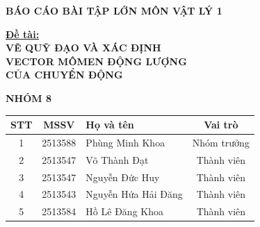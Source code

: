\documentclass{report}
\newcounter{line}
\begin{document}
\begin{titlepage}
\linespread{1.3}
\restoregeometry
\centering %

    \vspace*{0cm} %
    
    {\fontsize{20pt}{24pt}\selectfont %
        \textbf{BÁO CÁO BÀI TẬP LỚN MÔN VẬT LÝ 1}}
    
    \vfill %
    
    {\fontsize{20pt}{24pt}\selectfont
        \textbf{\underline{Đề tài:}}} \\
    \vspace{1.5cm}
    {\fontsize{26pt}{30pt}\selectfont %
        \textbf{VẼ QUỸ ĐẠO VÀ XÁC ĐỊNH\\VECTOR MÔMEN ĐỘNG LƯỢNG\\CỦA CHUYỂN ĐỘNG}}
    
    \vfill %
    
    \begin{minipage}{0.9\textwidth}
        \centering
        {\fontsize{16pt}{20pt}\selectfont\textbf{NHÓM 8}}
        \vspace{0.75cm} %
        
        \normalsize %
        \begin{tabularx}{\textwidth}{|c|c|X|c|}
            \hline
            \textbf{STT} & \textbf{MSSV} & \textbf{Họ và tên} & \textbf{Vai trò} \\
            \hline
            1 & 2513588 & Phùng Minh Khoa & Nhóm trưởng \\
            \hline
            2 & 2513547 & Võ Thành Đạt & Thành viên \\
            \hline
            3 & 2513547 & Nguyễn Đức Huy & Thành viên \\
            \hline
            4 & 2513543 & Nguyễn Hứa Hải Đăng & Thành viên \\
            \hline
            5 & 2513584 & Hồ Lê Đăng Khoa & Thành viên \\
            \hline
        \end{tabularx}
        

\end{minipage}
\end{titlepage}
\end{document}
